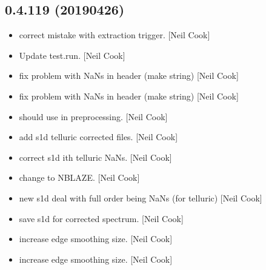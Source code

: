 \documentclass[a4paper,10pt,english]{report}
\begin{document}
\subsection{0.4.119 (2019\sphinxhyphen{}04\sphinxhyphen{}26)}
\label{\detokenize{misc/changelog:id161}}\begin{itemize}
\item {} 
 \sphinxhyphen{} correct mistake with extraction trigger. {[}Neil
Cook{]}

\item {} 
Update test.run. {[}Neil Cook{]}

\item {} 
 \sphinxhyphen{} fix problem with NaNs in header (make string) {[}Neil
Cook{]}

\item {} 
 \sphinxhyphen{} fix problem with NaNs in header (make string) {[}Neil
Cook{]}

\item {} 
 \sphinxhyphen{} should use  in preprocessing. {[}Neil
Cook{]}

\item {} 
 \sphinxhyphen{} add s1d telluric corrected files. {[}Neil Cook{]}

\item {} 
 \sphinxhyphen{} correct s1d ith telluric NaNs. {[}Neil Cook{]}

\item {} 
 \sphinxhyphen{} change to NBLAZE. {[}Neil Cook{]}

\item {} 
 \sphinxhyphen{} new s1d \sphinxhyphen{} deal with full order being NaNs (for
telluric) {[}Neil Cook{]}

\item {} 
 \sphinxhyphen{} save s1d for corrected spectrum. {[}Neil Cook{]}

\item {} 
 \sphinxhyphen{} increase edge smoothing size. {[}Neil Cook{]}

\item {} 
 \sphinxhyphen{} increase edge smoothing size. {[}Neil Cook{]}


\end{itemize}
\end{document}
